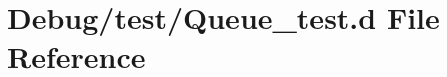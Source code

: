 \hypertarget{_queue__test_8d}{}\section{Debug/test/\+Queue\+\_\+test.d File Reference}
\label{_queue__test_8d}
